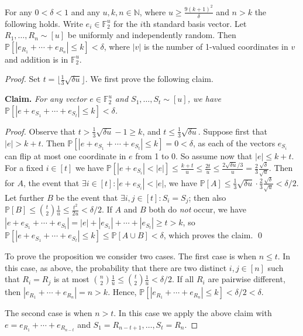 \documentclass{article}
\renewcommand{\Pr}[1]{\bP \left[ #1 \right]} %
\newcommand{\bF}{\ensuremath{\mathbb{F}}}
\newcommand{\bN}{\ensuremath{\mathbb{N}}}
\newcommand{\bP}{\ensuremath{\mathbb{P}}}
\begin{document}
\begin{proposition}
	\label{prop:hamming distance}
	For any $0 < \delta < 1$ and
	any $u,k,n \in \bN$, where $u \ge \frac{9(k+1)^2}{\delta}$
	and $n > k$ the following holds.  Write $e_i \in \bF_2^u$ for the $i$th standard basis vector. 
	Let $R_1,
	\dotsc, R_n \sim [u]$ be uniformly and independently random.  
	Then $\Pr{|e_{R_1} + \dotsm + e_{R_n}| \leq k} < \delta$, 
	where $|v|$ is the number of 1-valued coordinates in $v$ and addition is in $\bF_2^u$.
\end{proposition}
\begin{proof}
	Set $t = \lfloor \frac{1}{3} \sqrt{\delta u} \rfloor$. We first prove the following claim.
	
	\smallskip
	\noindent
	\textbf{Claim.}
	\textit{For any vector $e\in \bF_2^u$
	and $S_1, \ldots, S_t \sim [u]$, we have
	$\Pr{|e + e_{S_1} + \dotsm + e_{S_t}| \leq k} < \delta$.}
	
	\smallskip
	\noindent
	\textit{Proof.} Observe that $t > \frac{1}{3} \sqrt{\delta u} -1 \ge k$, and $t\le \frac{1}{3} \sqrt{\delta u}$.
	Suppose first that $|e| > k + t$. Then $\Pr{|e + e_{S_1} + \dotsm + e_{S_t}| \leq k}  = 0 < \delta$,
	as each of the vectors $e_{S_i}$ can flip at most one coordinate in $e$ from 1 to 0.
	So assume now that $|e| \leq k + t$. For a fixed $i \in [t]$ we have
	$\Pr{|e + e_{S_i}| < |e|} \leq \frac{k + t}{u} \le \frac{2t}u \le \frac{2\sqrt{\delta u}/3}{u} = \frac23\frac{\sqrt{\delta}}{\sqrt{u}}$.
	Then for $A$, the event that $\exists i \in [t] : |e + e_{S_i}| < |e|$, we have $\Pr{A} \leq  
	\frac{1}{3}\sqrt{\delta u} \cdot \frac23\frac{\sqrt{\delta}}{\sqrt{u}} < \delta/2$.
	Let further $B$ be the event that $\exists i,j \in [t] : S_i=S_j$; then also 
	$\Pr{B} \le \binom t2 \frac{1}{u} \leq \frac{t^2}{2u} < \delta/2$.
	If $A$ and $B$ both do \emph{not} occur, we have 
	$|e + e_{S_1} + \dotsm + e_{S_t}| = |e| + |e_{S_1}| + \dotsm + |e_{S_t}| \ge t>k$,
	so $\Pr{|e + e_{S_1} + \dotsm + e_{S_t}| \leq k} \le \Pr{A\cup B} < \delta$,
	which proves the claim. \qed
	
	\medskip
	\noindent
	To prove the proposition we consider two cases. The first case is when $n \le t$.
	In this case, as above, the probability that there are two distinct $i,j \in [n]$ such
	that $R_i=R_j$ is at most $\binom n2\frac{1}{u} \le \binom{t}{2}\frac{1}{u} < \delta/2$.
	If all $R_i$ are pairwise different, then $|e_{R_1} + \dotsm + e_{R_n}| = n > k$. 
	Hence, $\Pr{|e_{R_1} + \dotsm + e_{R_n}| \leq k} < \delta/2 < \delta$.
	
	The second case is when $n > t$. In this case we apply the above claim with
	$e = e_{R_{1}} + \cdots + e_{R_{n-t}}$ and $S_1 = R_{n-t+1}, \ldots, S_t = R_n$.
\end{proof}
\end{document}
